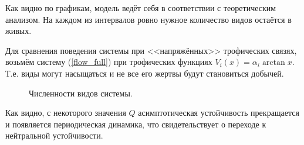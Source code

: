 Как видно по графикам, модель ведёт себя в соответствии с теоретическим анализом. На каждом из интервалов ровно нужное количество видов остаётся в живых. 

Для сравнения поведения системы при <<напряжённых>> трофических связях, возьмём систему (\ref{flow_full}) при трофических функциях \( V_i(x) = \alpha_i \arctan x \). Т.е. виды могут насыщаться и не все его жертвы будут становиться добычей.


\begin{figure}[H]
    \centering
\caption{Численности видов системы.}  \label{fig:flow_exp2}
\end{figure}

Как видно, с некоторого значения \(Q\) асимптотическая устойчивость прекращается и появляется периодическая динамика, что свидетельствует о переходе к нейтральной устойчивости.